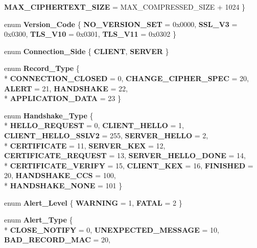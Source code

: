 \begin{DoxyCompactItemize}
{\bfseries M\-A\-X\-\_\-\-C\-I\-P\-H\-E\-R\-T\-E\-X\-T\-\_\-\-S\-I\-Z\-E} = M\-A\-X\-\_\-\-C\-O\-M\-P\-R\-E\-S\-S\-E\-D\-\_\-\-S\-I\-Z\-E + 1024
 \}
\item 
enum {\bfseries Version\-\_\-\-Code} \{ {\bfseries N\-O\-\_\-\-V\-E\-R\-S\-I\-O\-N\-\_\-\-S\-E\-T} = 0x0000, 
{\bfseries S\-S\-L\-\_\-\-V3} = 0x0300, 
{\bfseries T\-L\-S\-\_\-\-V10} = 0x0301, 
{\bfseries T\-L\-S\-\_\-\-V11} = 0x0302
 \}
\item 
enum {\bfseries Connection\-\_\-\-Side} \{ {\bfseries C\-L\-I\-E\-N\-T}, 
{\bfseries S\-E\-R\-V\-E\-R}
 \}
\item 
enum {\bfseries Record\-\_\-\-Type} \{ \\*
{\bfseries C\-O\-N\-N\-E\-C\-T\-I\-O\-N\-\_\-\-C\-L\-O\-S\-E\-D} = 0, 
{\bfseries C\-H\-A\-N\-G\-E\-\_\-\-C\-I\-P\-H\-E\-R\-\_\-\-S\-P\-E\-C} = 20, 
{\bfseries A\-L\-E\-R\-T} = 21, 
{\bfseries H\-A\-N\-D\-S\-H\-A\-K\-E} = 22, 
\\*
{\bfseries A\-P\-P\-L\-I\-C\-A\-T\-I\-O\-N\-\_\-\-D\-A\-T\-A} = 23
 \}
\item 
enum {\bfseries Handshake\-\_\-\-Type} \{ \\*
{\bfseries H\-E\-L\-L\-O\-\_\-\-R\-E\-Q\-U\-E\-S\-T} = 0, 
{\bfseries C\-L\-I\-E\-N\-T\-\_\-\-H\-E\-L\-L\-O} = 1, 
{\bfseries C\-L\-I\-E\-N\-T\-\_\-\-H\-E\-L\-L\-O\-\_\-\-S\-S\-L\-V2} = 255, 
{\bfseries S\-E\-R\-V\-E\-R\-\_\-\-H\-E\-L\-L\-O} = 2, 
\\*
{\bfseries C\-E\-R\-T\-I\-F\-I\-C\-A\-T\-E} = 11, 
{\bfseries S\-E\-R\-V\-E\-R\-\_\-\-K\-E\-X} = 12, 
{\bfseries C\-E\-R\-T\-I\-F\-I\-C\-A\-T\-E\-\_\-\-R\-E\-Q\-U\-E\-S\-T} = 13, 
{\bfseries S\-E\-R\-V\-E\-R\-\_\-\-H\-E\-L\-L\-O\-\_\-\-D\-O\-N\-E} = 14, 
\\*
{\bfseries C\-E\-R\-T\-I\-F\-I\-C\-A\-T\-E\-\_\-\-V\-E\-R\-I\-F\-Y} = 15, 
{\bfseries C\-L\-I\-E\-N\-T\-\_\-\-K\-E\-X} = 16, 
{\bfseries F\-I\-N\-I\-S\-H\-E\-D} = 20, 
{\bfseries H\-A\-N\-D\-S\-H\-A\-K\-E\-\_\-\-C\-C\-S} = 100, 
\\*
{\bfseries H\-A\-N\-D\-S\-H\-A\-K\-E\-\_\-\-N\-O\-N\-E} = 101
 \}
\item 
enum {\bfseries Alert\-\_\-\-Level} \{ {\bfseries W\-A\-R\-N\-I\-N\-G} = 1, 
{\bfseries F\-A\-T\-A\-L} = 2
 \}
\item 
enum {\bfseries Alert\-\_\-\-Type} \{ \\*
{\bfseries C\-L\-O\-S\-E\-\_\-\-N\-O\-T\-I\-F\-Y} = 0, 
{\bfseries U\-N\-E\-X\-P\-E\-C\-T\-E\-D\-\_\-\-M\-E\-S\-S\-A\-G\-E} = 10, 
{\bfseries B\-A\-D\-\_\-\-R\-E\-C\-O\-R\-D\-\_\-\-M\-A\-C} = 20, 

\end{DoxyCompactItemize}

